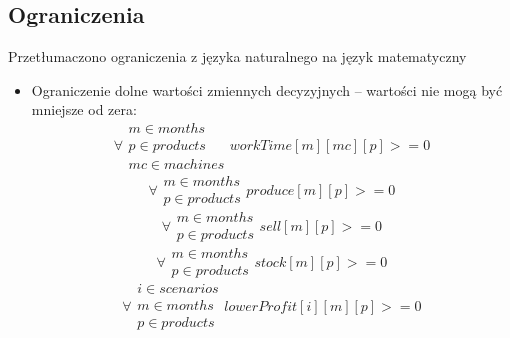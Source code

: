 \subsection{Ograniczenia}
Przetłumaczono ograniczenia z języka naturalnego na język matematyczny
\begin{itemize}
\item Ograniczenie dolne wartości zmiennych decyzyjnych – wartości nie mogą być mniejsze od zera:
	\begin{equation}
	\forall{\substack{
			m \in months \\ 
			p \in products \\
			mc \in machines}} workTime[m][mc][p] >=0
	\end{equation}
	\begin{equation}
	\forall{\substack{
			m \in months \\ 
			p \in products}} produce[m][p] >=0
	\end{equation}
	\begin{equation}
	\forall{\substack{
			m \in months \\ 
			p \in products}} sell[m][p] >=0
	\end{equation}
	\begin{equation}
	\forall{\substack{
			m \in months \\ 
			p \in products}} stock[m][p] >=0
	\end{equation}
	\begin{equation}
	\forall{\substack{
			i \in scenarios \\
			m \in months \\ 
			p \in products}} lowerProfit[i][m][p] >=0
	\end{equation}


\end{itemize}
